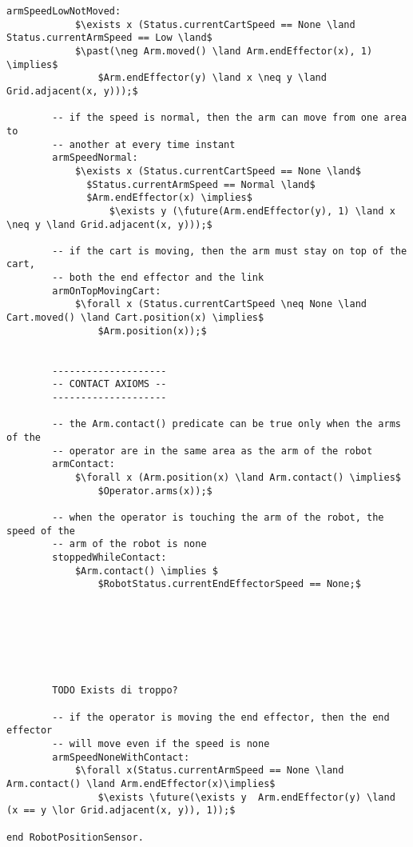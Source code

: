 \begin{lstlisting}[fontadjust, mathescape, frame=single]
        armSpeedLowNotMoved: 
            $\exists x (Status.currentCartSpeed == None \land Status.currentArmSpeed == Low \land$ 
            $\past(\neg Arm.moved() \land Arm.endEffector(x), 1) \implies$ 
                $Arm.endEffector(y) \land x \neq y \land Grid.adjacent(x, y)));$

        -- if the speed is normal, then the arm can move from one area to 
        -- another at every time instant
        armSpeedNormal: 
            $\exists x (Status.currentCartSpeed == None \land$
              $Status.currentArmSpeed == Normal \land$
              $Arm.endEffector(x) \implies$
                  $\exists y (\future(Arm.endEffector(y), 1) \land x \neq y \land Grid.adjacent(x, y)));$

        -- if the cart is moving, then the arm must stay on top of the cart,
        -- both the end effector and the link
        armOnTopMovingCart: 
            $\forall x (Status.currentCartSpeed \neq None \land Cart.moved() \land Cart.position(x) \implies$
                $Arm.position(x));$


        --------------------
        -- CONTACT AXIOMS --
        --------------------

        -- the Arm.contact() predicate can be true only when the arms of the 
        -- operator are in the same area as the arm of the robot
        armContact:
            $\forall x (Arm.position(x) \land Arm.contact() \implies$
                $Operator.arms(x));$

        -- when the operator is touching the arm of the robot, the speed of the
        -- arm of the robot is none
        stoppedWhileContact:
            $Arm.contact() \implies $
                $RobotStatus.currentEndEffectorSpeed == None;$







        TODO Exists di troppo?
                
        -- if the operator is moving the end effector, then the end effector 
        -- will move even if the speed is none
        armSpeedNoneWithContact: 
            $\forall x(Status.currentArmSpeed == None \land Arm.contact() \land Arm.endEffector(x)\implies$
                $\exists \future(\exists y  Arm.endEffector(y) \land (x == y \lor Grid.adjacent(x, y)), 1));$
        
end RobotPositionSensor.
\end{lstlisting}